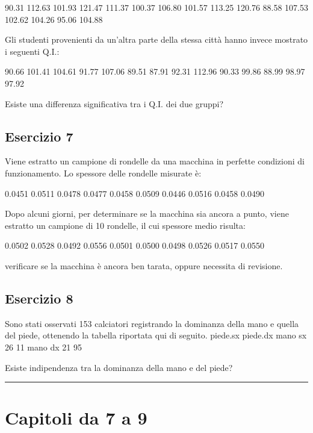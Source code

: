 \documentclass[a4paper,12pt,oneside]{book}
\begin{document}
90.31 112.63 101.93 121.47 111.37 100.37 106.80 101.57 113.25 120.76 88.58 107.53 102.62 104.26 95.06 104.88

Gli studenti provenienti da un'altra parte della stessa città hanno invece mostrato i seguenti Q.I.:

90.66 101.41 104.61 91.77 107.06 89.51 87.91 92.31 112.96 90.33 99.86 88.99 98.97 97.92

Esiste una differenza significativa tra i Q.I. dei due gruppi?

\hypertarget{esercizio-7-1}{%
\subsection{Esercizio 7}\label{esercizio-7-1}}

Viene estratto un campione di rondelle da una macchina in perfette condizioni di funzionamento. Lo spessore delle rondelle misurate è:

0.0451 0.0511 0.0478 0.0477 0.0458 0.0509 0.0446 0.0516 0.0458 0.0490

Dopo alcuni giorni, per determinare se la macchina sia ancora a punto, viene estratto un campione di 10 rondelle, il cui spessore medio risulta:

0.0502 0.0528 0.0492 0.0556 0.0501 0.0500 0.0498 0.0526 0.0517 0.0550

verificare se la macchina è ancora ben tarata, oppure necessita di revisione.

\hypertarget{esercizio-8-1}{%
\subsection{Esercizio 8}\label{esercizio-8-1}}

Sono stati osservati 153 calciatori registrando la dominanza della mano e quella del piede, ottenendo la tabella riportata qui di seguito.
\textbar{} piede.sx \textbar{} piede.dx \textbar{}
mano sx \textbar{} 26 \textbar{} 11 \textbar{}
mano dx \textbar{} 21 \textbar{} 95 \textbar{}

Esiste indipendenza tra la dominanza della mano e del piede?

\begin{center}\rule{0.5\linewidth}{0.5pt}\end{center}

\hypertarget{capitoli-da-7-a-9}{%
\section{Capitoli da 7 a 9}\label{capitoli-da-7-a-9}}
\end{document}

